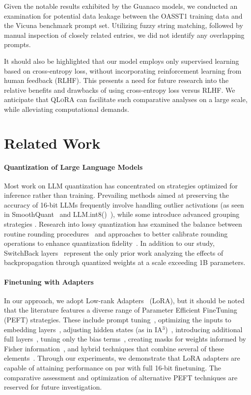 Given the notable results exhibited by the {Guanaco} models, we conducted an examination for potential data leakage between the OASST1 training data and the Vicuna benchmark prompt set. Utilizing fuzzy string matching, followed by manual inspection of closely related entries, we did not identify any overlapping prompts.

It should also be highlighted that our model employs only supervised learning based on cross-entropy loss, without incorporating reinforcement learning from human feedback (RLHF). This presents a need for future research into the relative benefits and drawbacks of using cross-entropy loss versus RLHF. We anticipate that \textsc{QLoRA} can facilitate such comparative analyses on a large scale, while alleviating computational demands.

\section{Related Work}

\paragraph{Quantization of Large Language Models} Most work on LLM quantization has concentrated on strategies optimized for inference rather than training. Prevailing methods aimed at preserving the accuracy of 16-bit LLMs frequently involve handling outlier activations (as seen in SmoothQuant~\citep{xiao2022smoothquant} and LLM.int8()~\citep{dettmers2022llm}), while some introduce advanced grouping strategies \citep{park2022nuqmm, yao2022zeroquant}. Research into lossy quantization has examined the balance between routine rounding procedures~\citep{dettmers2022case,zeng2022glm,pope2022efficiently} and approaches to better calibrate rounding operations to enhance quantization fidelity~\citep{frantar2022gptq}. In addition to our study, SwitchBack layers~\citep{wortsman2023stable} represent the only prior work analyzing the effects of backpropagation through quantized weights at a scale exceeding 1B parameters.

\paragraph{Finetuning with Adapters} In our approach, we adopt Low-rank Adapters~\citep{hu2021lora} (LoRA), but it should be noted that the literature features a diverse range of Parameter Efficient FineTuning (PEFT) strategies. These include prompt tuning~\citep{qin2021learning,lester2021power,li2021prefix}, optimizing the inputs to embedding layers~\citep{an2022input}, adjusting hidden states (as in IA$^3$)~\citep{liu2022few}, introducing additional full layers~\citep{houlsby2019parameter}, tuning only the bias terms~\citep{zaken2021bitfit}, creating masks for weights informed by Fisher information~\citep{sung2021training}, and hybrid techniques that combine several of these elements~\citep{henderson2021compacter}. Through our experiments, we demonstrate that LoRA adapters are capable of attaining performance on par with full 16-bit finetuning. The comparative assessment and optimization of alternative PEFT techniques are reserved for future investigation.

